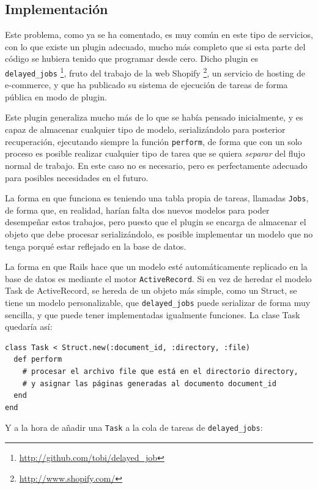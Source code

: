 
\subsection{Implementación} %
\label{sub:implementación}

Este problema, como ya se ha comentado, es muy común en este tipo de servicios, con lo que existe un plugin adecuado, mucho más completo que si esta parte del código se hubiera tenido que programar desde cero. Dicho plugin es \texttt{delayed\_jobs} \footnote{\url{http://github.com/tobi/delayed\_job}}, fruto del trabajo de la web Shopify \footnote{\url{http://www.shopify.com/}}, un servicio de hosting de e-commerce, y que ha publicado su sistema de ejecución de tareas de forma pública en modo de plugin.

Este plugin generaliza mucho más de lo que se había pensado inicialmente, y es capaz de almacenar cualquier tipo de modelo, serializándolo para posterior recuperación, ejecutando siempre la función \texttt{perform}, de forma que con un solo proceso es posible realizar cualquier tipo de tarea que se quiera \emph{separar} del flujo normal de trabajo. En este caso no es necesario, pero es perfectamente adecuado para posibles necesidades en el futuro.

La forma en que funciona es teniendo una tabla propia de tareas, llamadas \texttt{Jobs}, de forma que, en realidad, harían falta dos nuevos modelos para poder desempeñar estos trabajos, pero puesto que el plugin se encarga de almacenar el objeto que debe procesar serializándolo, es posible implementar un modelo que no tenga porqué estar reflejado en la base de datos.

La forma en que Rails hace que un modelo esté automáticamente replicado en la base de datos es mediante el motor \texttt{ActiveRecord}. Si en vez de heredar el modelo Task de ActiveRecord, se hereda de un objeto más simple, como un Struct, se tiene un modelo personalizable, que \texttt{delayed\_jobs} puede serializar de forma muy sencilla, y que puede tener implementadas igualmente funciones. La clase Task quedaría así:
\begin{verbatim}
class Task < Struct.new(:document_id, :directory, :file)
  def perform
    # procesar el archivo file que está en el directorio directory,
    # y asignar las páginas generadas al documento document_id
  end    
end
\end{verbatim}

Y a la hora de añadir una \texttt{Task} a la cola de tareas de \texttt{delayed\_jobs}:

